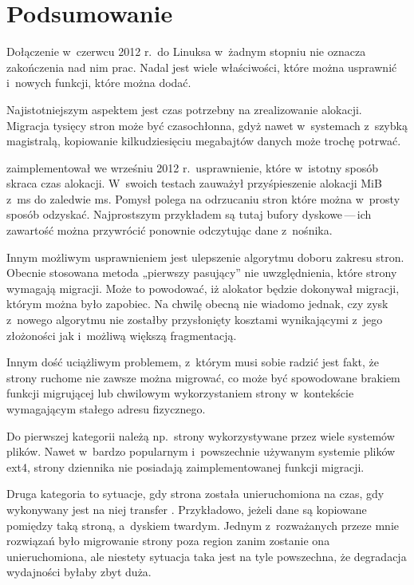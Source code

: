 \section{Podsumowanie}

Dołączenie  w~czerwcu 2012 r.\ do Linuksa w~żadnym stopniu nie
oznacza zakończenia nad nim prac.  Nadal jest wiele właściwości, które
można usprawnić i~nowych funkcji, które można dodać.

Najistotniejszym aspektem  jest czas potrzebny na zrealizowanie
alokacji.  Migracja tysięcy stron może być czasochłonna, gdyż nawet
w~systemach z~szybką magistralą, kopiowanie kilkudziesięciu megabajtów
danych może trochę potrwać.

\textcite{patch:cma-discard} zaimplementował we wrześniu 2012
r.\ usprawnienie, które w~istotny sposób skraca czas alokacji.
W~swoich testach zauważył przyśpieszenie alokacji \unit[10]{MiB}
z~\unit[146]{ms} do zaledwie \unit[7]{ms}.  Pomysł polega na
odrzucaniu stron które można w~prosty sposób odzyskać.  Najprostszym
przykładem są tutaj bufory dyskowe\,---\,ich zawartość można
przywrócić ponownie odczytując dane z~nośnika.

Innym możliwym usprawnieniem  jest ulepszenie algorytmu doboru
zakresu stron.  Obecnie stosowana metoda „pierwszy pasujący” nie
uwzględnienia, które strony wymagają migracji.  Może to powodować, iż
alokator będzie dokonywał migracji, którym można było zapobiec.  Na
chwilę obecną nie wiadomo jednak, czy zysk z~nowego algorytmu nie
zostałby przysłonięty kosztami wynikającymi z~jego złożoności jak
i~możliwą większą fragmentacją.

Innym dość uciążliwym problemem, z~którym  musi sobie radzić jest
fakt, że strony ruchome nie zawsze można migrować, co może być
spowodowane brakiem funkcji migrującej lub chwilowym wykorzystaniem
strony w~kontekście wymagającym stałego adresu fizycznego.

Do pierwszej kategorii należą np.\ strony wykorzystywane przez wiele
systemów plików.  Nawet w~bardzo popularnym i~powszechnie używanym
systemie plików ext4, strony dziennika nie posiadają zaimplementowanej
funkcji migracji.

Druga kategoria to sytuacje, gdy strona została unieruchomiona na
czas, gdy wykonywany jest na niej transfer .  Przykładowo,
jeżeli dane są kopiowane pomiędzy taką stroną, a~dyskiem twardym.
Jednym z~rozważanych przeze mnie rozwiązań było migrowanie strony poza
region  zanim zostanie ona unieruchomiona, ale niestety
sytuacja taka jest na tyle powszechna, że degradacja wydajności byłaby
zbyt duża.

